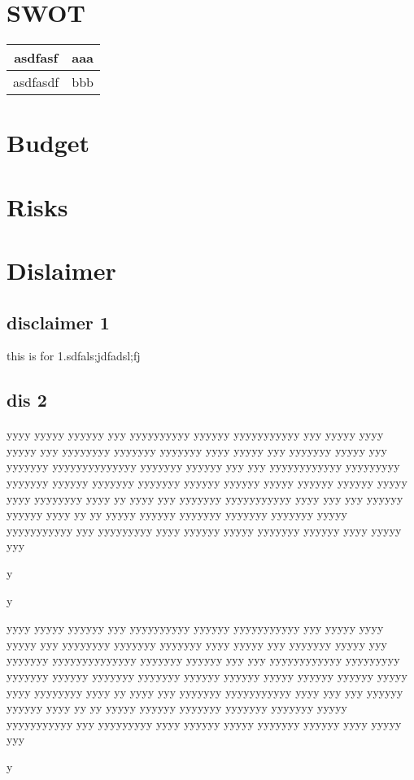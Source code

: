\documentclass[11pt]{article}
\begin{document}
\newpage{}
\section{SWOT}
\begin{tabular}{ | c | c | }
    \hline
    asdfasf & aaa  \\ \hline
    asdfasdf			 & bbb  \\ \hline
    \hline
  \end{tabular}

\newpage{}
\section{Budget}


\newpage{}
\section{Risks}


\newpage{}
\section{Dislaimer}
\subsection{ disclaimer 1 }
this is for 1.sdfals;jdfadsl;fj

			
\subsection{ dis 2 }
yyyy yyyyy yyyyyy yyy yyyyyyyyyy yyyyyy yyyyyyyyyyy yyy yyyyy yyyy yyyyy yyy yyyyyyyy yyyyyyy yyyyyyy yyyy yyyyy yyy yyyyyyy yyyyy yyy yyyyyyy yyyyyyyyyyyyyy yyyyyyy yyyyyy yyy yyy yyyyyyyyyyyy  yyyyyyyyy yyyyyyy yyyyyy yyyyyyy yyyyyyy yyyyyy yyyyyy yyyyy yyyyyy yyyyyy yyyyy yyyy yyyyyyyy yyyy yy yyyy yyy yyyyyyy yyyyyyyyyyy yyyy yyy yyy yyyyyy yyyyyy yyyy yy yy yyyyy  yyyyyy yyyyyyy yyyyyyy yyyyyyy yyyyy yyyyyyyyyyy yyy yyyyyyyyy yyyy yyyyyy yyyyy yyyyyyy yyyyyy yyyy yyyyy yyy

y

y



yyyy yyyyy yyyyyy yyy yyyyyyyyyy yyyyyy yyyyyyyyyyy yyy yyyyy yyyy yyyyy yyy yyyyyyyy yyyyyyy yyyyyyy yyyy yyyyy yyy yyyyyyy yyyyy yyy yyyyyyy yyyyyyyyyyyyyy yyyyyyy yyyyyy yyy yyy yyyyyyyyyyyy  yyyyyyyyy yyyyyyy yyyyyy yyyyyyy yyyyyyy yyyyyy yyyyyy yyyyy yyyyyy yyyyyy yyyyy yyyy yyyyyyyy yyyy yy yyyy yyy yyyyyyy yyyyyyyyyyy yyyy yyy yyy yyyyyy yyyyyy yyyy yy yy yyyyy  yyyyyy yyyyyyy yyyyyyy yyyyyyy yyyyy yyyyyyyyyyy yyy yyyyyyyyy yyyy yyyyyy yyyyy yyyyyyy yyyyyy yyyy yyyyy yyy

y
\end{document}
